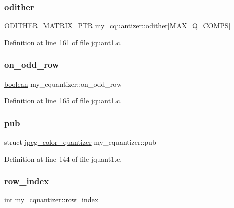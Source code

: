 \subsubsection{\texorpdfstring{odither}{odither}}
{\footnotesize\ttfamily \mbox{\hyperlink{jquant1_8c_adf00bce01b4be95b97238b73f71a24ea}{O\+D\+I\+T\+H\+E\+R\+\_\+\+M\+A\+T\+R\+I\+X\+\_\+\+P\+TR}} my\+\_\+cquantizer\+::odither\mbox{[}\mbox{\hyperlink{jquant1_8c_aab2c575f4e3d73fa8e03c145e00459df}{M\+A\+X\+\_\+\+Q\+\_\+\+C\+O\+M\+PS}}\mbox{]}}



Definition at line 161 of file jquant1.\+c.

\mbox{\label{structmy__cquantizer_a7745a27202b6a562461aa19ecf74638d}} 
\subsubsection{\texorpdfstring{on\_odd\_row}{on\_odd\_row}}
{\footnotesize\ttfamily \mbox{\hyperlink{jmorecfg_8h_a7c6368b321bd9acd0149b030bb8275ed}{boolean}} my\+\_\+cquantizer\+::on\+\_\+odd\+\_\+row}



Definition at line 165 of file jquant1.\+c.

\mbox{\label{structmy__cquantizer_a81f2eb75e01985369a162d52f5086409}} 
\subsubsection{\texorpdfstring{pub}{pub}}
{\footnotesize\ttfamily struct \mbox{\hyperlink{structjpeg__color__quantizer}{jpeg\+\_\+color\+\_\+quantizer}} my\+\_\+cquantizer\+::pub}



Definition at line 144 of file jquant1.\+c.

\mbox{\label{structmy__cquantizer_a0f10920c096845b912925a98019afc62}} 
\subsubsection{\texorpdfstring{row\_index}{row\_index}}
{\footnotesize\ttfamily int my\+\_\+cquantizer\+::row\+\_\+index}



